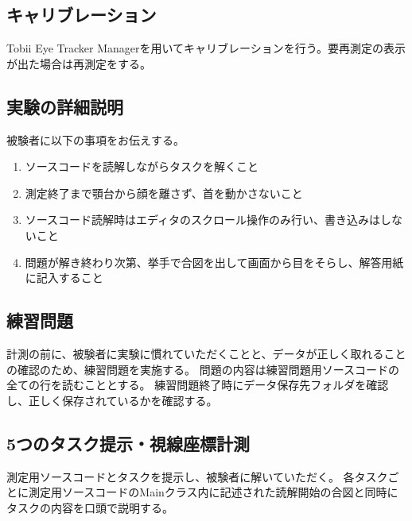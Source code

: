 \documentclass[paper=a4paper,fontsize=11pt]{jlreq}
\begin{document}
    \subsection{キャリブレーション}
      Tobii Eye Tracker Managerを用いてキャリブレーションを行う。要再測定の表示が出た場合は再測定をする。

    \subsection{実験の詳細説明}
      被験者に以下の事項をお伝えする。
      \begin{enumerate}
        \item ソースコードを読解しながらタスクを解くこと
        \item 測定終了まで顎台から顔を離さず、首を動かさないこと
        \item ソースコード読解時はエディタのスクロール操作のみ行い、書き込みはしないこと
        \item 問題が解き終わり次第、挙手で合図を出して画面から目をそらし、解答用紙に記入すること
      \end{enumerate}
    
    \subsection{練習問題}
      計測の前に、被験者に実験に慣れていただくことと、データが正しく取れることの確認のため、練習問題を実施する。
      問題の内容は練習問題用ソースコードの全ての行を読むこととする。
      練習問題終了時にデータ保存先フォルダを確認し、正しく保存されているかを確認する。

    \subsection{5つのタスク提示・視線座標計測}
      測定用ソースコードとタスクを提示し、被験者に解いていただく。
      各タスクごとに測定用ソースコードのMainクラス内に記述された読解開始の合図と同時にタスクの内容を口頭で説明する。
  \clearpage
\end{document}
